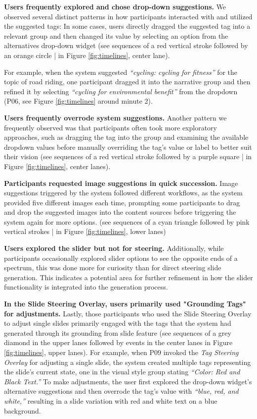 \textbf{Users frequently explored and chose drop-down suggestions.}
We observed several distinct patterns in how participants interacted with and utilized the suggested tags: In some cases, users directly dragged the suggested tag into a relevant group and then changed its value by selecting an option from the alternatives drop-down widget (see sequences of a red vertical stroke followed by an orange circle | in Figure \ref{fig:timelines}, center lane).

For example, when the system suggested \textit{“cycling: cycling for fitness”} for the topic of road riding, one participant dragged it into the narrative group and then refined it by selecting \textit{“cycling for environmental benefit”} from the dropdown (P06, see Figure \ref{fig:timelines} around minute 2). 

\textbf{Users frequently overrode system suggestions.}
Another pattern we frequently observed was that participants often took more exploratory approaches, such as dragging the tag into the group and examining the available dropdown values before manually overriding the tag’s value or label to better suit their vision (see sequences of a red vertical stroke followed by a purple square | in Figure \ref{fig:timelines}, center lanes).


\textbf{Participants requested image suggestions in quick succession.}
Image suggestions triggered by the system followed different workflows, as the system provided five different images each time, prompting some participants to drag and drop the suggested images into the content sources before triggering the system again for more options. 
(see sequences of a cyan triangle followed by pink vertical strokes  | in Figure \ref{fig:timelines}, lower lanes)


\textbf{Users explored the slider but not for steering. }
Additionally, while participants occasionally explored slider options to see the opposite ends of a spectrum, this was done more for curiosity than for direct steering slide generation. 
This indicates a potential area for further refinement in how the slider functionality is integrated into the generation process.


\textbf{In the Slide Steering Overlay, users primarily used "Grounding Tags" for adjustments. }
Lastly, those participants who used the Slide Steering Overlay to adjust single slides primarily engaged with the tags that the system had generated through its grounding from slide feature (see sequences of a grey diamond in the upper lanes followed by events in the center lanes in Figure \ref{fig:timelines}, upper lanes). For example, when P09 invoked the \textit{Tag Steering Overlay} for adjusting a single slide, the system created multiple tags representing the slide’s current state, one in the visual style group stating \textit{“Color: Red and Black Text.”} To make adjustments, the user first explored the drop-down widget’s alternative suggestions and then overrode the tag’s value with \textit{“blue, red, and white,”} resulting in a slide variation with red and white text on a blue background. 




